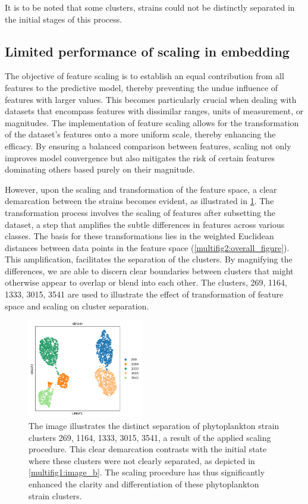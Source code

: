 \documentclass[12pt,a4paper]{article}
\begin{document}
It is to be noted that some clusters, strains could not be distinctly separated in the initial stages of this process.

\subsection{Limited performance of scaling in embedding}
The objective of feature scaling is to establish an equal contribution from all features to the predictive model, thereby preventing the undue influence of features with larger values. This becomes particularly crucial when dealing with datasets that encompass features with dissimilar ranges, units of measurement, or magnitudes. The implementation of feature scaling allows for the transformation of the dataset’s features onto a more uniform scale, thereby enhancing the efficacy. By ensuring a balanced comparison between features, scaling not only improves model convergence but also mitigates the risk of certain features dominating others based purely on their magnitude.

However, upon the scaling and transformation of the feature space, a clear demarcation between the strains becomes evident, as illustrated in \ref{clustersafterscaling}. The transformation process involves the scaling of features after subsetting the dataset, a step that amplifies the subtle differences in features across various classes. The basis for these transformations lies in the weighted Euclidean distances between data points in the feature space (\ref{multifig2:overall_figure}). This amplification, facilitates the separation of the clusters. By magnifying the differences, we are able to discern clear boundaries between clusters that might otherwise appear to overlap or blend into each other. The clusters, 269, 1164, 1333, 3015, 3541 are used to illustrate the effect of transformation of feature space and scaling on cluster separation.

\begin{figure}
  \centering
  \includegraphics[width=0.45\textwidth]{Figures/phytoplanktonclusterseparationafterscaling.png}
  \caption{The image illustrates the distinct separation of phytoplankton strain clusters 269, 1164, 1333, 3015, 3541, a result of the applied scaling procedure. This clear demarcation contrasts with the initial state where these clusters were not clearly separated, as depicted in \ref{multifig1:image_b}. The scaling procedure has thus significantly enhanced the clarity and differentiation of these phytoplankton strain clusters.}
  \label{clustersafterscaling}
\end{figure}
\end{document}
